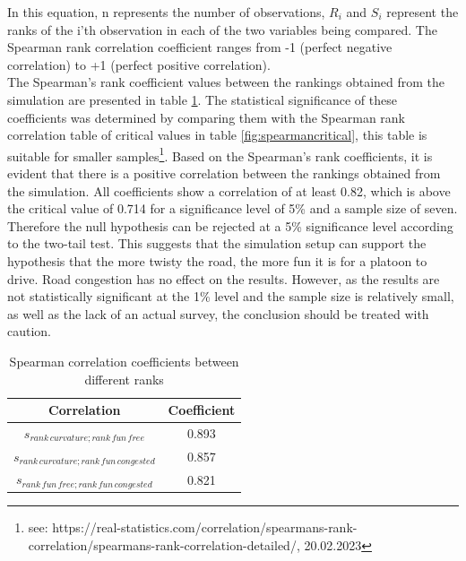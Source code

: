 In this equation, n represents the number of observations, $R_i$ and $S_i$ represent the ranks of the i'th observation in each of the two variables being compared. The Spearman rank correlation coefficient ranges from -1 (perfect negative correlation) to +1 (perfect positive correlation). \\

The Spearman's rank coefficient values between the rankings obtained from the simulation are presented in table \ref{tab:spearman_results}. The statistical significance of these coefficients was determined by comparing them with the Spearman rank correlation table of critical values in table \ref{fig:spearmancritical}, this table is suitable for smaller samples\footnote{see: https://real-statistics.com/correlation/spearmans-rank-correlation/spearmans-rank-correlation-detailed/, 20.02.2023}. Based on the Spearman's rank coefficients, it is evident that there is a positive correlation between the rankings obtained from the simulation. All coefficients show a correlation of at least 0.82, which is above the critical value of 0.714 for a significance level of 5\% and a sample size of seven. Therefore the null hypothesis can be rejected at a 5\% significance level according to the two-tail test.
This suggests that the simulation setup can support the hypothesis that the more twisty the road, the more fun it is for a platoon to drive. Road congestion has no effect on the results. However, as the results are not statistically significant at the 1\% level and the sample size is relatively small, as well as the lack of an actual survey, the conclusion should be treated with caution.



\begin{table}
    \centering
    \begin{tabular}{|c|c|} 
        \hline
        Correlation & Coefficient \\ \hline
        $s_{rank\,curvature; rank\,fun\,free}$ & 0.893 \\ 
        $s_{rank\,curvature; rank\,fun\,congested}$ & 0.857 \\
        $s_{rank\,fun\,free; rank\,fun\,congested}$ & 0.821 \\
        \hline
    \end{tabular}
    \caption{Spearman correlation coefficients between different ranks}
    \label{tab:spearman_results}
\end{table}


